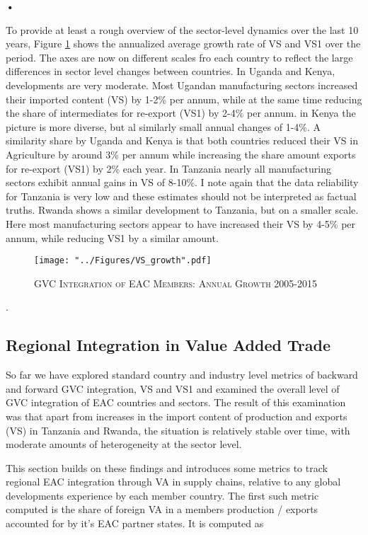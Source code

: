 \textbf{\textbf{•}}\documentclass[a4paper]{article}
\begin{document}
To provide at least a rough overview of the sector-level dynamics over the last 10 years, Figure \ref{fig:VSgr} shows the annualized average growth rate of VS and VS1 over the period. The axes are now on different scales fro each country to reflect the large differences in sector level changes between countries. In Uganda and Kenya, developments are very moderate. Most Ugandan manufacturing sectors increased their imported content (VS) by 1-2\% per annum, while at the same time reducing the share of intermediates for re-export (VS1) by 2-4\% per annum. in Kenya the picture is more diverse, but al similarly small annual changes of 1-4\%. A similarity share by Uganda and Kenya is that both countries reduced their VS in Agriculture by around 3\% per annum while increasing the share amount exports for re-export (VS1) by 2\% each year. In Tanzania nearly all manufacturing sectors exhibit annual gains in VS of 8-10\%. I note again that the data reliability for Tanzania is very low and these estimates should not be interpreted as factual truths. Rwanda shows a similar development to Tanzania, but on a smaller scale. Here most manufacturing sectors appear to have increased their VS by 4-5\% per annum, while reducing VS1 by a similar amount.

\begin{figure}[h!]
\centering
\caption{\label{fig:VSgr}\textsc{GVC Integration of EAC Members: Annual Growth 2005-2015}}
\texttt{[image: "../Figures/VS\_growth".pdf]} %
\end{figure}
\FloatBarrier


.


\subsection{Regional Integration in Value Added Trade}
So far we have explored standard country and industry level metrics of backward and forward GVC integration, VS and VS1 and examined the overall level of GVC integration of EAC countries and sectors. The result of this examination was that apart from increases in the import content of production and exports (VS) in Tanzania and Rwanda, the situation is relatively stable over time, with moderate amounts of heterogeneity at the sector level. \newline

This section builds on these findings and introduces some metrics to track regional EAC integration through VA in supply chains, relative to any global developments experience by each member country. The first such metric computed is the share of foreign VA in a members production / exports accounted for by it's EAC partner states. It is computed as
\end{document}

